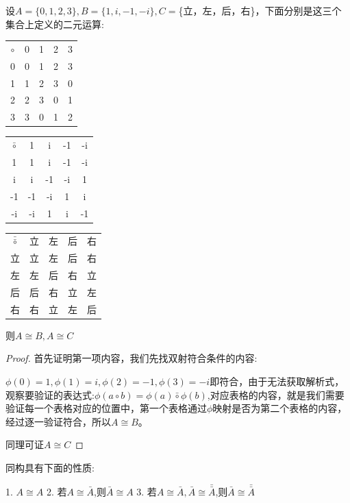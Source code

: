 \documentclass[
	11pt, %
	fleqn, %
	a4paper, %
]{LegrandOrangeBook}
\begin{document}
\begin{example}
	设$A=\{0,1,2,3\},B=\{1,i,-1,-i\},C=$\{立，左，后，右\}，下面分别是这三个集合上定义的二元运算:
	\begin{center}
		\begin{tabular}{c|cccc}

			$\circ$ & 0 & 1 & 2 & 3 \\\cline{1-5}
			0       & 0 & 1 & 2 & 3 \\
			1       & 1 & 2 & 3 & 0 \\
			2       & 2 & 3 & 0 & 1 \\
			3       & 3 & 0 & 1 & 2
		\end{tabular}
		\quad
		\begin{tabular}{c|cccc}

			$\bar{\circ}$ & 1  & i  & -1 & -i \\\cline{1-5}
			1             & 1  & i  & -1 & -i \\
			i             & i  & -1 & -i & 1  \\
			-1            & -1 & -i & 1  & i  \\
			-i            & -i & 1  & i  & -1
		\end{tabular}
		\quad
		\begin{tabular}{c|cccc}

			$\bar{\bar{\circ}}$ & 立 & 左 & 后 & 右 \\\cline{1-5}
			立                  & 立 & 左 & 后 & 右 \\
			左                  & 左 & 后 & 右 & 立 \\
			后                  & 后 & 右 & 立 & 左 \\
			右                  & 右 & 立 & 左 & 后
		\end{tabular}
	\end{center}

	则$A\cong B,A\cong C$
\end{example}

\begin{proof}
	首先证明第一项内容，我们先找双射符合条件的内容:

	$\phi(0)=1,\phi(1)=i,\phi(2)=-1,\phi(3)=-i$即符合，由于无法获取解析式，观察要验证的表达式:$\phi(a\circ b)=\phi(a)\bar{\circ}\phi(b)$,对应表格的内容，就是我们需要验证每一个表格对应的位置中，第一个表格通过$\phi$映射是否为第二个表格的内容，经过逐一验证符合，所以$A\cong B$。

	同理可证$A\cong C$
\end{proof}

\begin{theorem}
	同构具有下面的性质:

	1. $A\cong A$
	2. 若$A\cong \bar{A}$,则$\bar{A}\cong A$
	3. 若$A\cong\bar{A},\bar{A}\cong\bar{\bar{A}}$,则$\bar{A}\cong\bar{\bar{A}}$
\end{theorem}
\end{document}
